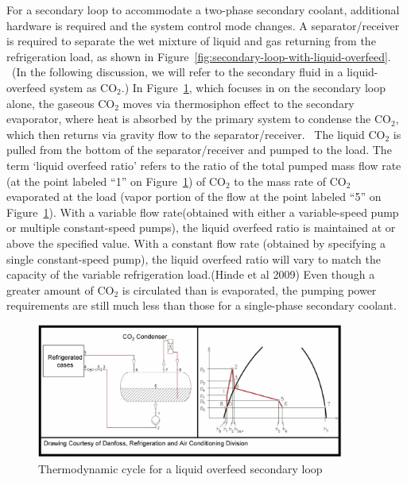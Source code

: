 For a secondary loop to accommodate a two-phase secondary coolant, additional hardware is required and the system control mode changes. A separator/receiver is required to separate the wet mixture of liquid and gas returning from the refrigeration load, as shown in Figure~\ref{fig:secondary-loop-with-liquid-overfeed}. ~(In the following discussion, we will refer to the secondary fluid in a liquid-overfeed system as CO\(_{2}\).) In Figure~\ref{fig:thermodynamic-cycle-for-a-liquid-overfeed}, which focuses in on the secondary loop alone, the gaseous CO\(_{2}\) moves via thermosiphon effect to the secondary evaporator, where heat is absorbed by the primary system to condense the CO\(_{2}\), which then returns via gravity flow to the separator/receiver.~ The liquid CO\(_{2}\) is pulled from the bottom of the separator/receiver and pumped to the load. The term `liquid overfeed ratio' refers to the ratio of the total pumped mass flow rate (at the point labeled ``1'' on Figure~\ref{fig:thermodynamic-cycle-for-a-liquid-overfeed}) of CO\(_{2}\) to the mass rate of CO\(_{2}\) evaporated at the load (vapor portion of the flow at the point labeled ``5'' on Figure~\ref{fig:thermodynamic-cycle-for-a-liquid-overfeed}). With a variable flow rate(obtained with either a variable-speed pump or multiple constant-speed pumps), the liquid overfeed ratio is maintained at or above the specified value. With a constant flow rate (obtained by specifying a single constant-speed pump), the liquid overfeed ratio will vary to match the capacity of the variable refrigeration load.(Hinde et al 2009) Even though a greater amount of CO\(_{2}\) is circulated than is evaporated, the pumping power requirements are still much less than those for a single-phase secondary coolant.

\begin{figure}[hbtp] %
\centering
\includegraphics[width=0.9\textwidth, height=0.9\textheight, keepaspectratio=true]{media/image6325.png}
\caption{Thermodynamic cycle for a liquid overfeed secondary loop \protect \label{fig:thermodynamic-cycle-for-a-liquid-overfeed}}
\end{figure}

